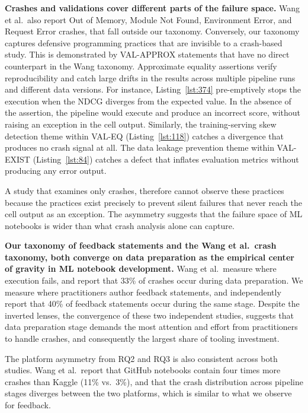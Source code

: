 \documentclass[a4paper,USenglish,cleveref,autoref,thm-restate,anonymous]{lipics-v2021}       %
\begin{document}
\textbf{Crashes and validations cover different parts of the failure space.}
Wang et al.\ also report
Out of Memory, Module Not Found, Environment Error, and Request Error crashes,
that fall outside our taxonomy.
Conversely, our taxonomy captures defensive programming practices
that are invisible to a crash-based study.
This is demonstrated by VAL-APPROX statements
that have no direct counterpart in the Wang taxonomy.
Approximate equality assertions verify reproducibility
and catch large drifts in the results
across multiple pipeline runs
and different data versions.
For instance,
Listing~\ref{lst:374} pre-emptively stops the execution
when the NDCG diverges from the expected value.
In the absence of the assertion,
the pipeline would execute and produce an incorrect score,
without raising an exception in the cell output.
Similarly, the training-serving skew detection theme within VAL-EQ (Listing~\ref{lst:118})
catches a divergence that produces no crash signal at all.
The data leakage prevention theme within VAL-EXIST (Listing~\ref{lst:84})
catches a defect that inflates evaluation metrics
without producing any error output.

A study that examines only crashes,
therefore cannot observe these practices
because the practices exist precisely to prevent silent failures
that never reach the cell output as an exception.
The asymmetry suggests that the failure space of ML notebooks
is wider than what crash analysis alone can capture.

\textbf{Our taxonomy of feedback statements
and the Wang et al.\ crash taxonomy,
both converge on data preparation
as the empirical center of gravity
in ML notebook development.}
Wang et al.\ measure where execution fails,
and report that 33\% of crashes occur during data preparation.
We measure where practitioners author feedback statements,
and independently report
that 40\% of feedback statements occur during the same stage.
Despite the inverted lenses,
the convergence of these two independent studies,
suggests that data preparation stage
demands the most attention and effort from practitioners to handle crashes,
and consequently the largest share of tooling investment.

The platform asymmetry from RQ2 and RQ3 is also consistent across both studies.
Wang et al.\ report that GitHub notebooks contain four times more crashes than Kaggle (11\% vs.\ 3\%),
and that the crash distribution across pipeline stages
diverges between the two platforms,
which is similar to what we observe for feedback.
\end{document}
